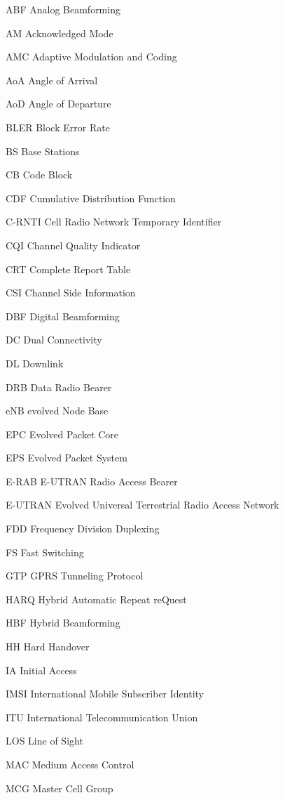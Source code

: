 \begin{abbreviations}

\item[ABF] Analog Beamforming
\item[AM] Acknowledged Mode
\item[AMC] Adaptive Modulation and Coding
\item[AoA] Angle of Arrival
\item[AoD] Angle of Departure
\item[BLER] Block Error Rate
\item[BS] Base Stations
\item[CB] Code Block
\item[CDF] Cumulative Distribution Function
\item[C-RNTI] Cell Radio Network Temporary Identifier
\item[CQI] Channel Quality Indicator
\item[CRT] Complete Report Table
\item[CSI] Channel Side Information
\item[DBF] Digital Beamforming
\item[DC] Dual Connectivity
\item[DL] Downlink
\item[DRB] Data Radio Bearer
\item[eNB] evolved Node Base
\item[EPC] Evolved Packet Core
\item[EPS] Evolved Packet System
\item[E-RAB] E-UTRAN Radio Access Bearer
\item[E-UTRAN] Evolved Universal Terrestrial Radio Access Network
\item[FDD] Frequency Division Duplexing
\item[FS] Fast Switching
\item[GTP] GPRS Tunneling Protocol
\item[HARQ] Hybrid Automatic Repeat reQuest
\item[HBF] Hybrid Beamforming
\item[HH] Hard Handover
\item[IA] Initial Access
\item[IMSI] International Mobile Subscriber Identity
\item[ITU] International Telecommunication Union
\item[LOS] Line of Sight
\item[MAC] Medium Access Control
\item[MCG] Master Cell Group

\end{abbreviations}

